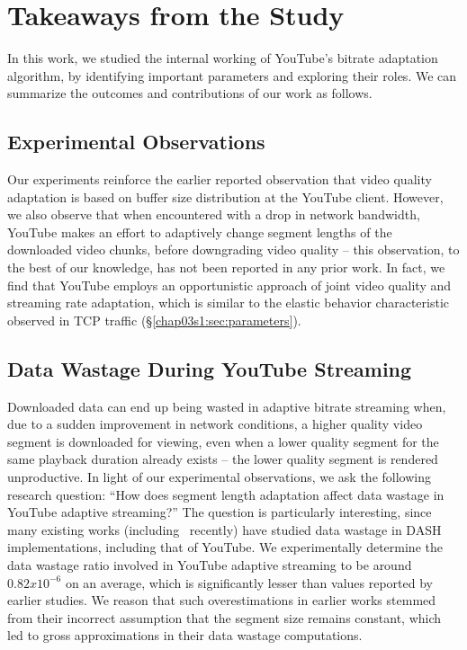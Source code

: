 \section{Takeaways from the Study}
\label{chap03s1:sec:conclusion}

In this work, we studied the internal working of YouTube's bitrate adaptation algorithm, by identifying important parameters and exploring their roles.
We can summarize the outcomes and contributions of our work as follows.

\subsection{Experimental Observations} Our experiments reinforce the earlier reported observation that video quality adaptation is based on buffer size distribution at the YouTube client.
However, we also observe that when encountered with a drop in network bandwidth, YouTube makes an effort to adaptively change segment lengths of the downloaded video chunks, before downgrading video quality -- this observation, to the best of our knowledge, has not been reported in any prior work.
In fact, we find that YouTube employs an opportunistic approach of joint video quality and streaming rate adaptation, which is similar to the elastic behavior characteristic  observed in \ac{TCP} traffic (\S\ref{chap03s1:sec:parameters}).

\subsection{Data Wastage During YouTube Streaming} Downloaded data can end up being wasted in adaptive bitrate streaming when, due to a sudden improvement in network conditions, a higher quality video segment is downloaded for viewing, even when a lower quality segment for the same playback duration already exists -- the lower quality segment is rendered unproductive.
In light of our experimental observations, we ask the following research question: ``How does segment length adaptation affect data wastage in YouTube adaptive streaming?''
The question is particularly interesting, since many existing works (including~\cite{sieber2016sacrificing} recently) have studied data wastage in \ac{DASH} implementations, including that of YouTube.
We experimentally determine the data wastage ratio involved in YouTube adaptive streaming to be around $0.82x10^{-6}$ on an average, which is significantly lesser than values reported by earlier studies.%
We reason that such overestimations in earlier works stemmed from their incorrect assumption that the segment size remains constant, which led to gross approximations in their data wastage computations.

